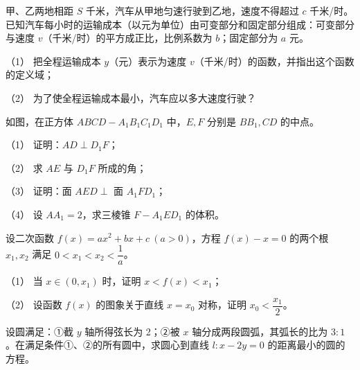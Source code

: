\begin{question}
甲、乙两地相距 $S$ 千米，汽车从甲地匀速行驶到乙地，速度不得超过 $c$ 千米/时。已知汽车每小时的运输成本（以元为单位）由可变部分和固定部分组成：可变部分与速度 $v$（千米/时）的平方成正比，比例系数为 $b$；固定部分为 $a$ 元。

（1） 把全程运输成本 $y$（元）表示为速度 $v$（千米/时）的函数，并指出这个函数的定义域；

（2） 为了使全程运输成本最小，汽车应以多大速度行驶？

\Needspace{0.4\textheight}
\end{question}
\begin{question}
如图，在正方体 $ABCD-A_1B_1C_1D_1$ 中，$E,F$ 分别是 $BB_1,CD$ 的中点。

（1） 证明：$AD\perp D_1F$；

（2） 求 $AE$ 与 $D_1F$ 所成的角；

（3） 证明：面 $AED\perp$ 面 $A_1FD_1$；

（4） 设 $AA_1=2$，求三棱锥 $F-A_1ED_1$ 的体积。
\nopagebreak[4]
\begin{center}\end{center}
\nopagebreak[4]
\end{question}
\begin{question}
设二次函数 $f(x)=ax^2+bx+c\ (a>0)$，方程 $f(x)-x=0$ 的两个根 $x_1,x_2$ 满足 $0<x_1<x_2<\dfrac1a$。

（1） 当 $x\in(0,x_1)$ 时，证明 $x<f(x)<x_1$；

（2） 设函数 $f(x)$ 的图象关于直线 $x=x_0$ 对称，证明 $x_0<\dfrac{x_1}{2}$。

\end{question}
\begin{question}
设圆满足：①截 $y$ 轴所得弦长为 2；②被 $x$ 轴分成两段圆弧，其弧长的比为 $3:1$。在满足条件①、②的所有圆中，求圆心到直线 $l:x-2y=0$ 的距离最小的圆的方程。

\end{question}